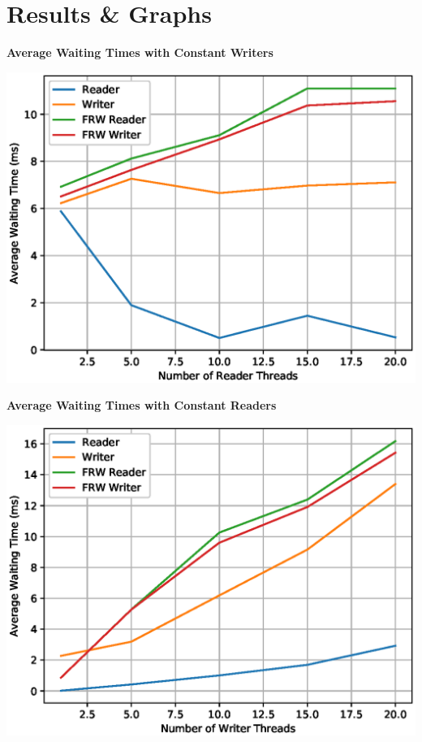 \documentclass[a4paper,12pt]{report}
\begin{document}
\section{Results \& Graphs}
\begin{center}
\begin{large}
\textbf{Average Waiting Times with Constant Writers}\\
\end{large}
\includegraphics[scale=0.7]{./ConstantWriters-WaitingTimes.eps}
\end{center}
\begin{center}
\begin{large}
\textbf{Average Waiting Times with Constant Readers}\\
\end{large}
\includegraphics[scale=0.7]{./ConstantReaders-WaitingTimes.eps}
\end{center}
\end{document}
